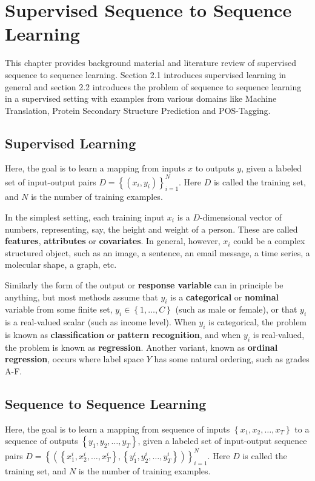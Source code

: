 \chapter{Supervised Sequence to Sequence Learning}
This chapter provides background material and literature review of supervised sequence to sequence learning. Section 2.1 introduces supervised learning in general and section 2.2 introduces the problem of sequence to sequence learning in a supervised setting with examples from various domains like Machine Translation, Protein Secondary Structure Prediction and POS-Tagging.

\section{Supervised Learning}
Here, the goal is to learn a mapping from inputs $x$ to outputs $y$, given a labeled set of input-output pairs $D = \left \{ \left (x_{i}, y_{i} \right ) \right \}_{i=1}^{N}$. Here $D$ is called the training set, and $N$ is the number of training examples.

In the simplest setting, each training input $x_{i}$ is a $D$-dimensional vector of numbers, representing, say, the height and weight of a person. These are called \textbf{features}, \textbf{attributes} or \textbf{covariates}. In general, however, $x_{i}$ could be a complex structured object, such as an image, a sentence, an email message, a time series, a molecular shape, a graph, etc.

Similarly the form of the output or \textbf{response variable} can in principle be anything, but most methods assume that $y_{i}$ is a \textbf{categorical} or \textbf{nominal} variable from some finite set, $y_{i} \in \left \{1, \ldots, C \right \}$ (such as male or female), or that $y_{i}$ is a real-valued scalar (such as income level). When $y_{i}$ is categorical, the problem is known as \textbf{classification} or \textbf{pattern recognition}, and when $y_{i}$ is real-valued, the problem is known as \textbf{regression}. Another variant, known as \textbf{ordinal regression}, occurs where label space $Y$ has some natural ordering, such as grades A-F.

\section{Sequence to Sequence Learning}
Here, the goal is to learn a mapping from sequence of inputs $\left \{x_{1}, x_{2}, \ldots, x_{T} \right \}$ to a sequence of outputs $\left \{y_{1}, y_{2}, \ldots, y_{T} \right \}$, given a labeled set of input-output sequence pairs $D = \left \{ \left ( \left \{x^{i}_{1}, x^{i}_{2}, \ldots, x^{i}_{T} \right \}, \left \{y^{i}_{1}, y^{i}_{2}, \ldots, y^{i}_{T} \right \} \right ) \right \}_{i=1}^{N}$. Here $D$ is called the training set, and $N$ is the number of training examples.